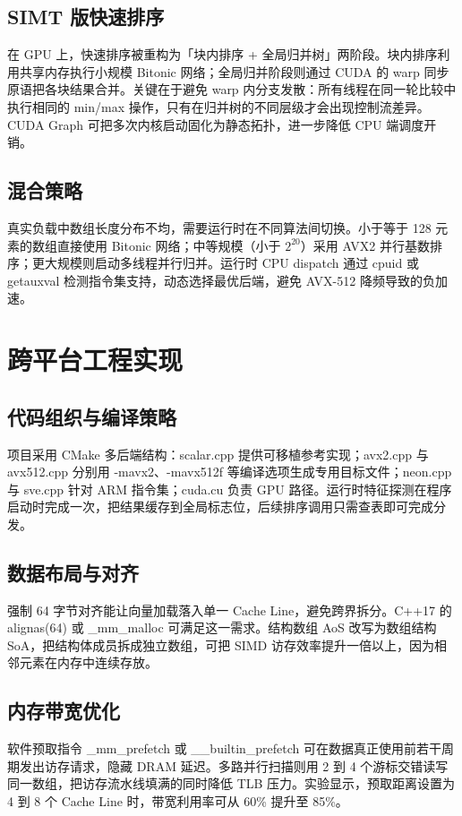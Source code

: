 \section{SIMT 版快速排序}
在 GPU 上，快速排序被重构为「块内排序 + 全局归并树」两阶段。块内排序利用共享内存执行小规模 Bitonic 网络；全局归并阶段则通过 CUDA 的 warp 同步原语把各块结果合并。关键在于避免 warp 内分支发散：所有线程在同一轮比较中执行相同的 min/max 操作，只有在归并树的不同层级才会出现控制流差异。CUDA Graph 可把多次内核启动固化为静态拓扑，进一步降低 CPU 端调度开销。\par
\section{混合策略}
真实负载中数组长度分布不均，需要运行时在不同算法间切换。小于等于 128 元素的数组直接使用 Bitonic 网络；中等规模（小于 $2^{20}$）采用 AVX2 并行基数排序；更大规模则启动多线程并行归并。运行时 CPU dispatch 通过 cpuid 或 getauxval 检测指令集支持，动态选择最优后端，避免 AVX-512 降频导致的负加速。\par
\chapter{跨平台工程实现}
\section{代码组织与编译策略}
项目采用 CMake 多后端结构：scalar.cpp 提供可移植参考实现；avx2.cpp 与 avx512.cpp 分别用 -mavx2、-mavx512f 等编译选项生成专用目标文件；neon.cpp 与 sve.cpp 针对 ARM 指令集；cuda.cu 负责 GPU 路径。运行时特征探测在程序启动时完成一次，把结果缓存到全局标志位，后续排序调用只需查表即可完成分发。\par
\section{数据布局与对齐}
强制 64 字节对齐能让向量加载落入单一 Cache Line，避免跨界拆分。C++17 的 alignas(64) 或 \_{}mm\_{}malloc 可满足这一需求。结构数组 AoS 改写为数组结构 SoA，把结构体成员拆成独立数组，可把 SIMD 访存效率提升一倍以上，因为相邻元素在内存中连续存放。\par
\section{内存带宽优化}
软件预取指令 \_{}mm\_{}prefetch 或 \_{}\_{}builtin\_{}prefetch 可在数据真正使用前若干周期发出访存请求，隐藏 DRAM 延迟。多路并行扫描则用 2 到 4 个游标交错读写同一数组，把访存流水线填满的同时降低 TLB 压力。实验显示，预取距离设置为 4 到 8 个 Cache Line 时，带宽利用率可从 60\%{} 提升至 85\%{}。\par
